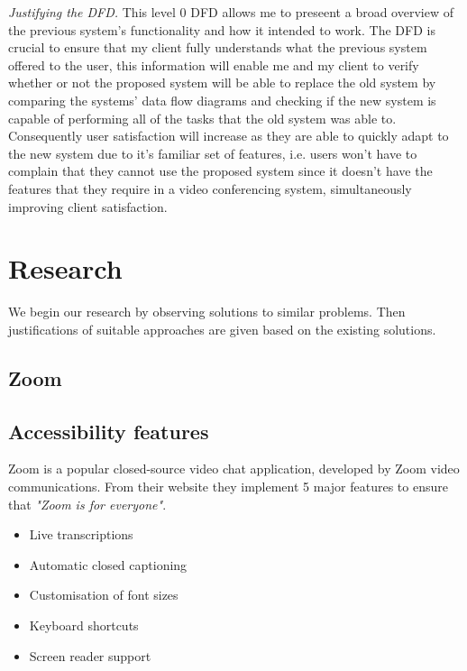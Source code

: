 \textit{Justifying the DFD.} This level 0 DFD allows me to 
preseent a broad overview of the previous system's
functionality and how it intended to work. The DFD is crucial
to ensure that my client fully understands what the previous 
system offered to the user, this information will enable me 
and my client to verify whether or not the proposed system
will be able to replace the old system by comparing the  
systems' data flow diagrams and checking if the new system is 
capable of performing all of the tasks that the old system 
was able to. Consequently user satisfaction will increase as 
they are able to quickly adapt to the new system due to it's
familiar set of features, i.e. users won't have to complain
that they cannot use the proposed system since it doesn't 
have the features that they require in a video conferencing 
system, simultaneously improving client satisfaction.

\section{Research}
\label{sec:research}


We begin our research by observing solutions to similar 
problems. Then justifications of suitable approaches are given
based on the existing solutions.

\subsection{Zoom}

\subsection*{Accessibility features}

Zoom is a popular closed-source video chat application,
developed by Zoom video communications. From their website 
\cite{zoom} they implement 5 major features to ensure that 
\textit{"Zoom is for everyone"}. 

\begin{itemize}
  \item Live transcriptions
  \item Automatic closed captioning
  \item Customisation of font sizes
  \item Keyboard shortcuts
  \item Screen reader support
\end{itemize}


